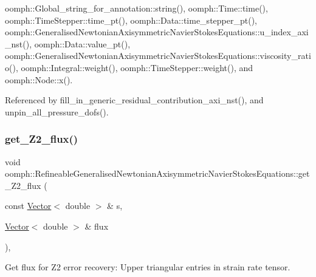 oomph\+::\+Global\+\_\+string\+\_\+for\+\_\+annotation\+::string(), oomph\+::\+Time\+::time(), oomph\+::\+Time\+Stepper\+::time\+\_\+pt(), oomph\+::\+Data\+::time\+\_\+stepper\+\_\+pt(), oomph\+::\+Generalised\+Newtonian\+Axisymmetric\+Navier\+Stokes\+Equations\+::u\+\_\+index\+\_\+axi\+\_\+nst(), oomph\+::\+Data\+::value\+\_\+pt(), oomph\+::\+Generalised\+Newtonian\+Axisymmetric\+Navier\+Stokes\+Equations\+::viscosity\+\_\+ratio(), oomph\+::\+Integral\+::weight(), oomph\+::\+Time\+Stepper\+::weight(), and oomph\+::\+Node\+::x().



Referenced by fill\+\_\+in\+\_\+generic\+\_\+residual\+\_\+contribution\+\_\+axi\+\_\+nst(), and unpin\+\_\+all\+\_\+pressure\+\_\+dofs().

\mbox{\label{classoomph_1_1RefineableGeneralisedNewtonianAxisymmetricNavierStokesEquations_a6858f80eb16799bc4bfc844e0e297432}} 
\subsubsection{\texorpdfstring{get\+\_\+\+Z2\+\_\+flux()}{get\_Z2\_flux()}}
{\footnotesize\ttfamily void oomph\+::\+Refineable\+Generalised\+Newtonian\+Axisymmetric\+Navier\+Stokes\+Equations\+::get\+\_\+\+Z2\+\_\+flux (\begin{DoxyParamCaption}\item[{const \hyperlink{classoomph_1_1Vector}{Vector}$<$ double $>$ \&}]{s,  }\item[{\hyperlink{classoomph_1_1Vector}{Vector}$<$ double $>$ \&}]{flux }\end{DoxyParamCaption})\hspace{0.3cm}{\ttfamily [inline]}, {\ttfamily [virtual]}}



Get \textquotesingle{}flux\textquotesingle{} for Z2 error recovery\+: Upper triangular entries in strain rate tensor. 



